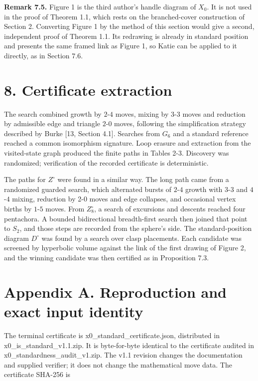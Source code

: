 \documentclass[11pt,letterpaper]{article}
\begin{document}
\medskip\noindent\textbf{Remark 7.5.} Figure 1 is the third author's handle diagram of $X_0$. %
It is not used in the proof of Theorem 1.1, which rests on the branched-cover construction of Section 2. Converting Figure 1 by the method of this section would give a second, independent proof of Theorem 1.1. Its redrawing is already in standard position and presents the same framed link as Figure 1, so Katie can be applied to it directly, as in Section 7.6.

\section*{8. Certificate extraction}
The search combined growth by $2$-$4$ moves, mixing by $3$-$3$ moves and reduction by admissible edge and triangle $2$-$0$ moves, following the simplification strategy described by Burke [13, Section 4.1]. Searches from $G_6$ and a standard reference reached a common isomorphism signature. Loop erasure and extraction from the visited-state graph produced the finite paths in Tables 2-3. Discovery was randomized; verification of the recorded certificate is deterministic.

The paths for $Z^\circ$ were found in a similar way. The long path came from a randomized guarded search, which alternated bursts of $2$-$4$ growth with $3$-$3$ and $4$-$4$ mixing, reduction by 2-0 moves and edge collapses, and occasional vertex births by $1$-$5$ moves. From $Z^\circ_8$, a search of excursions and descents reached four pentachora. A bounded bidirectional breadth-first search then joined that point to $S_2$, and those steps are recorded from the sphere's side. The standard-position diagram $D^\circ$ was found by a search over clasp placements. Each candidate was screened by hyperbolic volume against the link of the first drawing of Figure 2, and the winning candidate was then certified as in Proposition 7.3.

\section*{Appendix A. Reproduction and exact input identity}
The terminal certificate is x0\_standard\_certificate.json, distributed in x0\_is\_standard\_v1.1.zip. It is byte-for-byte identical to the certificate audited in x0\_standardness\_audit\_v1.zip. The v1.1 revision changes the documentation and supplied verifier; it does not change the mathematical move data. The certificate SHA-256 is
\end{document}
